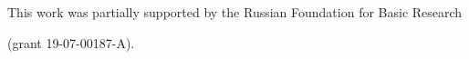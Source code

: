       


      


















 \Ack


      \noindent


      This work was partially supported by the Russian Foundation for Basic Research 


 (grant 19-07-00187-A).





\vspace*{12pt}





